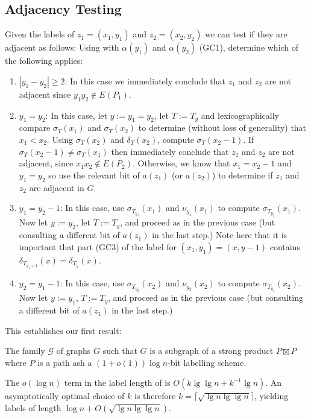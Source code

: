 \documentclass[kpfonts]{patmorin}
\begin{document}
\subsection{Adjacency Testing}

Given the labels of $z_1=(x_1,y_1)$ and $z_2=(x_2,y_2)$ we can test if they are adjacent as follows: Using with $\alpha(y_1)$ and $\alpha(y_2)$ (GC1), determine which of the following applies:
\begin{enumerate}
  \item $|y_1-y_2|\ge 2$: In this case we immediately conclude that $z_1$ and $z_2$ are not adjacent since $y_1y_2\not\in E(P_1)$.  
  
  \item $y_1=y_2$: In this case, let $y:=y_1=y_2$, let $T:=T_y$ and lexicographically compare $\sigma_T(x_1)$ and $\sigma_T(x_2)$ to determine (without loss of generality) that $x_1<x_2$.  Using $\sigma_{T}(x_2)$ and $\delta_{T}(x_2)$, compute $\sigma_T(x_2-1)$.  If $\sigma_T(x_2-1)\neq \sigma_T(x_1)$ then immediately conclude that $z_1$ and $z_2$ are not adjacent, since $x_1x_2\not\in E(P_2)$.  Otherwise, we know that $x_1=x_2-1$ and $y_1=y_2$ so use the relevant bit of $a(z_1)$ (or $a(z_2)$) to determine if $z_1$ and $z_2$ are adjacent in $G$.
  
  \item $y_1=y_2-1$: In this case, use $\sigma_{T_{y_1}}(x_1)$ and $\nu_{y_1}(x_1)$ to compute $\sigma_{T_{y_2}}(x_1)$.  Now let $y:=y_2$, let $T:=T_{y}$, and proceed as in the previous case (but consulting a different bit of $a(z_1)$ in the last step.)  Note here that it is important that part (GC3) of the label for $(x_1,y_1)=(x,y-1)$ contains $\delta_{T_{y_1+1}}(x)=\delta_{T_{y}}(x)$.
  
  \item $y_2=y_1-1$: In this case, use $\sigma_{T_{y_2}}(x_2)$ and $\nu_{y_2}(x_2)$ to compute $\sigma_{T_{y_1}}(x_2)$.  Now let $y:=y_1$, $T:=T_{y}$, and proceed as in the previous case (but consulting a different bit of $a(z_1)$ in the last step.)
\end{enumerate}

This establishes our first result:

\begin{thm}
  The family $\mathcal{G}$ of graphs $G$ such that $G$ is a subgraph of a strong product $P\boxtimes P$ where $P$ is a path ash a $(1+o(1))\log n$-bit labelling scheme.
\end{thm}

\begin{rem}
  The $o(\log n)$ term in the label length of  is $O(k\lg\lg n + k^{-1}\lg n)$.  An asymptotically optimal choice of $k$ is therefore $k=\lceil\sqrt{\lg n\lg\lg n}\rceil$, yielding labels of length $\log n + O(\sqrt{\lg n\lg\lg n})$.
\end{rem}
\end{document}
